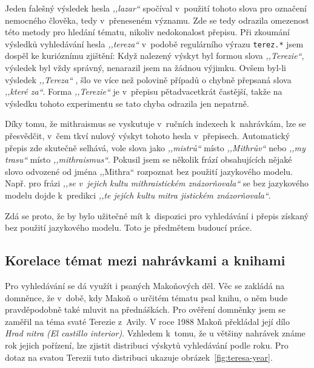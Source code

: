 Jeden falešný
výsledek hesla {\em ,,lazar``} spočíval v~použití tohoto slova pro označení
nemocného člověka, tedy v~přeneseném významu. Zde se tedy odrazila omezenost
této metody pro hledání tématu, nikoliv nedokonalost přepisu. Při zkoumání
výsledků vyhledávání hesla {\em ,,tereza``} v~podobě regulárního výrazu
\texttt{terez.*} jsem dospěl ke kurióznímu zjištění: Když nalezený výskyt byl
formou slova {\em ,,Terezie``}, výsledek byl vždy správný, nenarazil jsem na žádnou
výjimku. Ovšem byl-li výsledek {\em ,,Tereza`` }, šlo ve více než polovině případů o
chybně přepsaná slova {\em ,,které za``}. Forma {\em ,,Terezie``} je v~přepisu
pětadvacetkrát častější, takže na výsledku tohoto experimentu se tato chyba
odrazila jen nepatrně.

Díky tomu, že mithraismus se vyskutuje v~ručních indexech k~nahrávkám, lze se
přesvědčit, v~čem tkví nulový výskyt tohoto hesla v~přepisech. Automatický
přepis zde skutečně selhává, vole slova jako {\em ,,mistrů``} místo {\em
,,Mithrův``} nebo {\em ,,my trasu``} místo {\em ,,mithraismus``}. Pokusil jsem
se několik frází obsahujících nějaké slovo odvozené od jména ,,Mithra``
rozpoznat bez použití jazykového modelu. Např. pro frázi {\em ,,se v~jejich
kultu mithraistickém znázorňovala``} se bez jazykového modelu dojde k~predikci
{\em ,,te jejích kultu mitra jistickém znázorňovala``}.

Zdá se proto, že by bylo užitečné mít k~dispozici pro vyhledávání i přepis
získaný bez použití jazykového modelu. Toto je předmětem budoucí práce.

\subsection{Korelace témat mezi nahrávkami a knihami}

Pro vyhledávání se dá využít i psaných Makoňových děl. Věc se zakládá na
domněnce, že v~době, kdy Makoň o určitém tématu psal knihu, o něm bude
pravděpodobně také mluvit na přednáškách. Pro ověření domněnky jsem se zaměřil
na téma svaté Terezie z~Avily. V roce 1988 Makoň překládal její dílo {\em Hrad nitra
(El castillo interior)}. Vzhledem k~tomu, že u většiny nahrávek známe rok jejich
pořízení, lze zjistit distribuci výskytů vyhledávání podle roku. Pro dotaz na
svatou Terezii tuto distribuci ukazuje obrázek~\ref{fig:teresa-year}.

